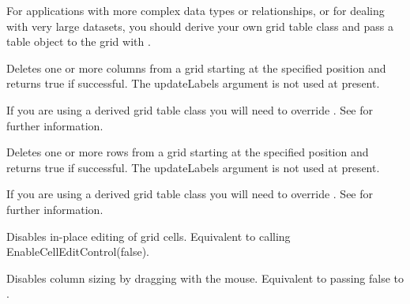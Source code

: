 For applications with more complex data types or relationships, or for
dealing with very large datasets, you should derive your own grid table
class and pass a table object to the grid with .



\label{wxgriddeletecols}


Deletes one or more columns from a grid starting at the specified position and returns
true if successful. The updateLabels argument is not used at present.

If you are using a derived grid table class you will need to override
. See
 for further information.



\label{wxgriddeleterows}


Deletes one or more rows from a grid starting at the specified position and returns
true if successful. The updateLabels argument is not used at present.

If you are using a derived grid table class you will need to override
. See
 for further information.



\label{wxgriddisablecelleditcontrol}


Disables in-place editing of grid cells.
Equivalent to calling EnableCellEditControl(false).



\label{wxgriddisabledragcolsize}


Disables column sizing by dragging with the mouse. Equivalent to passing false to
.



